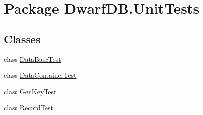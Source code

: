 \hypertarget{namespace_dwarf_d_b_1_1_unit_tests}{
\section{Package DwarfDB.UnitTests}
\label{namespace_dwarf_d_b_1_1_unit_tests}
}
\subsection*{Classes}
\begin{DoxyCompactItemize}
\item 
class \hyperlink{class_dwarf_d_b_1_1_unit_tests_1_1_data_base_test}{DataBaseTest}
\item 
class \hyperlink{class_dwarf_d_b_1_1_unit_tests_1_1_data_container_test}{DataContainerTest}
\item 
class \hyperlink{class_dwarf_d_b_1_1_unit_tests_1_1_gen_key_test}{GenKeyTest}
\item 
class \hyperlink{class_dwarf_d_b_1_1_unit_tests_1_1_record_test}{RecordTest}
\end{DoxyCompactItemize}
